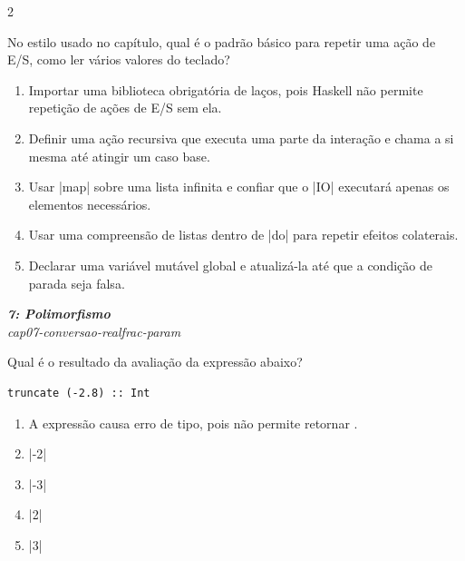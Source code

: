 \documentclass[a4paper,10pt,brazil]{article}
\begin{document}
\begin{multicols}{2}
\begin{flushright}
\end{flushright}
No estilo usado no capítulo, qual é o padrão básico para repetir uma ação de E/S, como ler vários valores do teclado?

\begin{enumerate}
  \item Importar uma biblioteca obrigatória de laços, pois Haskell não permite repetição de ações de E/S sem ela.

  \item Definir uma ação recursiva que executa uma parte da interação e chama a si mesma até atingir um caso base.

  \item Usar \haskellinline|map| sobre uma lista infinita e confiar que o \haskellinline|IO| executará apenas os elementos necessários.

  \item Usar uma compreensão de listas dentro de \haskellinline|do| para repetir efeitos colaterais.

  \item Declarar uma variável mutável global e atualizá-la até que a condição de parada seja falsa.


\end{enumerate}

\begin{flushright}
  \footnotesize
  \textit{\textbf{7: Polimorfismo}}\\
  \textit{cap07-conversao-realfrac-param}\\

\end{flushright}
Qual é o resultado da avaliação da expressão abaixo?

\begin{verbatim}
truncate (-2.8) :: Int
\end{verbatim}

\begin{enumerate}
  \item A expressão causa erro de tipo, pois  não permite retornar .
  \item \haskellinline|-2|
  \item \haskellinline|-3|
  \item \haskellinline|2|
  \item \haskellinline|3|

\end{enumerate}


\end{multicols}
\end{document}
